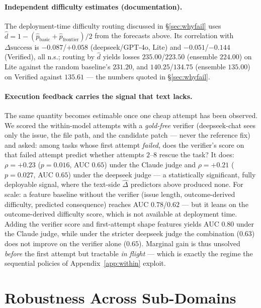 \documentclass{article}
\begin{document}
\paragraph{Independent difficulty estimates (documentation).} The
deployment-time difficulty routing discussed in \S\ref{sec:whyfail}
uses $\hat{d} = 1 - (\hat{p}_{\mathrm{basic}} +
\hat{p}_{\mathrm{frontier}})/2$ from the forecasts above. Its
correlation with $\Delta\mathrm{success}$ is $-0.087$/$+0.058$
(deepseek/GPT-4o, Lite) and $-0.051$/$-0.144$ (Verified), all n.s.;
routing by $\hat{d}$ yields losses $235.00$/$223.50$ (ensemble
$224.00$) on Lite against the random baseline's $231.20$, and
$140.25$/$134.75$ (ensemble $135.00$) on Verified against $135.61$
--- the numbers quoted in \S\ref{sec:whyfail}.

\paragraph{Execution feedback carries the signal that text lacks.}
The same quantity becomes estimable once one cheap attempt has been
observed. We scored the within-model attempts with a \emph{gold-free}
verifier (deepseek-chat sees only the issue, the file path, and the
candidate patch --- never the reference fix) and asked: among tasks
whose first attempt \emph{failed}, does the verifier's score on that
failed attempt predict whether attempts $2$--$8$ rescue the task?
It does: $\rho = +0.23$ ($p = 0.016$, AUC $0.65$) under the Claude
judge and $\rho = +0.21$ ($p = 0.027$, AUC $0.65$) under the
deepseek judge --- a statistically significant, fully deployable
signal, where the text-side $\hat{\Delta}$ predictors above produced
none. For scale: a feature baseline without the verifier (issue
length, outcome-derived difficulty, predicted consequence) reaches
AUC $0.78$/$0.62$ --- but it leans on the outcome-derived difficulty
score, which is not available at deployment time. Adding the
verifier score and first-attempt shape features yields AUC $0.80$
under the Claude judge, while under the stricter deepseek judge the
combination ($0.63$) does not improve on the verifier alone
($0.65$). Marginal gain is
thus unsolved \emph{before} the first attempt but tractable
\emph{in flight} --- which is exactly the regime the sequential
policies of Appendix~\ref{app:within} exploit.

\section{Robustness Across Sub-Domains}
\label{app:subdomain}
\end{document}
